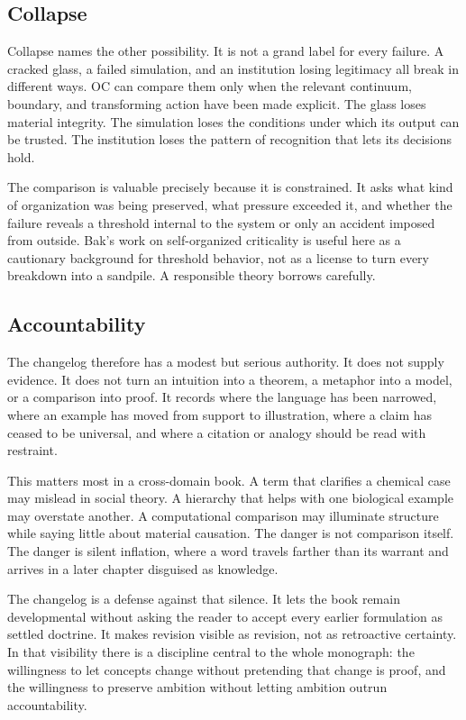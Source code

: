 \documentclass[11pt,a4paper,openany]{book}
\begin{document}
\subsection{Collapse}
Collapse names the other possibility. It is not a grand label for every failure. A cracked glass, a failed simulation, and an institution losing legitimacy all break in different ways. OC can compare them only when the relevant continuum, boundary, and transforming action have been made explicit. The glass loses material integrity. The simulation loses the conditions under which its output can be trusted. The institution loses the pattern of recognition that lets its decisions hold. \cite{nicolis_prigogine_selforg,kauffman_autocatalytic}\par
The comparison is valuable precisely because it is constrained. It asks what kind of organization was being preserved, what pressure exceeded it, and whether the failure reveals a threshold internal to the system or only an accident imposed from outside. Bak's work on self-organized criticality is useful here as a cautionary background for threshold behavior, not as a license to turn every breakdown into a sandpile. A responsible theory borrows carefully.\par
\subsection{Accountability}
The changelog therefore has a modest but serious authority. It does not supply evidence. It does not turn an intuition into a theorem, a metaphor into a model, or a comparison into proof. It records where the language has been narrowed, where an example has moved from support to illustration, where a claim has ceased to be universal, and where a citation or analogy should be read with restraint. \cite{nicolis_prigogine_selforg,kauffman_autocatalytic}\par
This matters most in a cross-domain book. A term that clarifies a chemical case may mislead in social theory. A hierarchy that helps with one biological example may overstate another. A computational comparison may illuminate structure while saying little about material causation. The danger is not comparison itself. The danger is silent inflation, where a word travels farther than its warrant and arrives in a later chapter disguised as knowledge.\par
The changelog is a defense against that silence. It lets the book remain developmental without asking the reader to accept every earlier formulation as settled doctrine. It makes revision visible as revision, not as retroactive certainty. In that visibility there is a discipline central to the whole monograph: the willingness to let concepts change without pretending that change is proof, and the willingness to preserve ambition without letting ambition outrun accountability.\par
\end{document}
